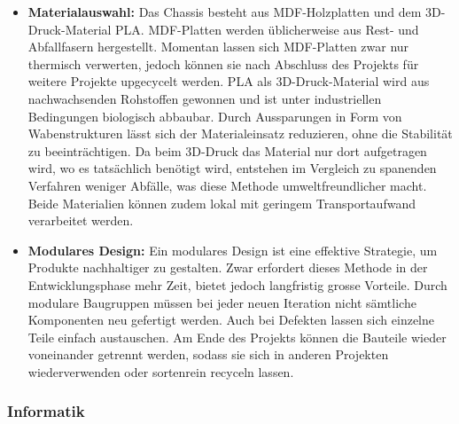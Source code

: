 \documentclass[../../main.tex]{subfiles} %
\begin{document}
\begin{itemize}
      \item \textbf{Materialauswahl:}
            Das Chassis besteht aus MDF-Holzplatten und dem 3D-Druck-Material PLA.
            MDF-Platten werden üblicherweise aus Rest- und Abfallfasern hergestellt.
            Momentan lassen sich MDF-Platten zwar nur thermisch verwerten, jedoch können
            sie nach Abschluss des Projekts für weitere Projekte upgecycelt werden.
            PLA als 3D-Druck-Material wird aus nachwachsenden Rohstoffen gewonnen und ist
            unter industriellen Bedingungen biologisch abbaubar. Durch Aussparungen in Form
            von Wabenstrukturen lässt sich der Materialeinsatz reduzieren, ohne die Stabilität
            zu beeinträchtigen. Da beim 3D-Druck das Material nur dort aufgetragen wird, wo es
            tatsächlich benötigt wird, entstehen im Vergleich zu spanenden Verfahren weniger Abfälle,
            was diese Methode umweltfreundlicher macht.
            Beide Materialien können zudem lokal mit geringem Transportaufwand verarbeitet werden.

      \item \textbf{Modulares Design:}
            Ein modulares Design ist eine effektive Strategie, um Produkte nachhaltiger zu gestalten.
            Zwar erfordert dieses Methode in der Entwicklungsphase mehr Zeit, bietet jedoch langfristig
            grosse Vorteile. Durch modulare Baugruppen müssen bei jeder neuen Iteration nicht sämtliche Komponenten
            neu gefertigt werden. Auch bei Defekten lassen sich einzelne Teile einfach austauschen.
            Am Ende des Projekts können die Bauteile wieder voneinander getrennt werden, sodass sie sich in
            anderen Projekten wiederverwenden oder sortenrein recyceln lassen.

\end{itemize}

\subsubsection{Informatik}
\end{document}
